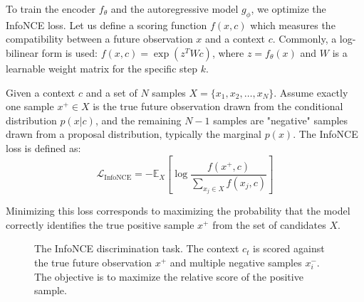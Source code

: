 To train the encoder $f_\theta$ and the autoregressive model $g_\phi$, we optimize the InfoNCE loss. Let us define a scoring function $f(x, c)$ which measures the compatibility between a future observation $x$ and a context $c$. Commonly, a log-bilinear form is used: $f(x, c) = \exp(z^T W c)$, where $z = f_\theta(x)$ and $W$ is a learnable weight matrix for the specific step $k$.

\begin{definition}
\label{def:infonce}
Given a context $c$ and a set of $N$ samples $X = \{x_1, x_2, \dots, x_N\}$. Assume exactly one sample $x^+ \in X$ is the true future observation drawn from the conditional distribution $p(x | c)$, and the remaining $N-1$ samples are "negative" samples drawn from a proposal distribution, typically the marginal $p(x)$. The InfoNCE loss is defined as:
\begin{equation}
    \mathcal{L}_{\text{InfoNCE}} = - \mathbb{E}_{X} \left[ \log \frac{f(x^+, c)}{\sum_{x_j \in X} f(x_j, c)} \right]
\end{equation}
\end{definition}

Minimizing this loss corresponds to maximizing the probability that the model correctly identifies the true positive sample $x^+$ from the set of candidates $X$.

\begin{figure}[htbp]
\centering
{}
\caption{The InfoNCE discrimination task. The context $c_t$ is scored against the true future observation $x^+$ and multiple negative samples $x^-_i$. The objective is to maximize the relative score of the positive sample.}
\label{fig:infonce_task}
\end{figure}


